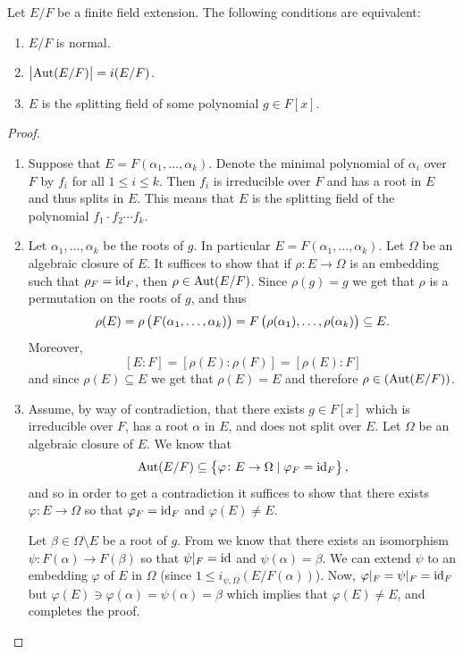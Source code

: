 \documentclass[11pt,a4paper]{article}
\begin{document}
\begin{proposition}
  \label{prop:i-normality}
  Let $E/F$ be a finite field extension.
  The following conditions are equivalent:
  \begin{enumerate}
    \item[(1)] $E/F$ is normal.
    \item[(2)] $\left\lvert\operatorname{Aut}(E/F)\right\rvert = i(E/F)$.
    \item[(3)] $E$ is the splitting field of some polynomial $g \in F[x]$. 
  \end{enumerate}
\end{proposition}
\begin{proof} \phantom{}
  \begin{enumerate}
    \item[$(1 \to 3)$] Suppose that $E = F(\alpha_1,\dots,\alpha_k)$.
      Denote the minimal polynomial of $\alpha_i$ over $F$
      by $f_i$ for all $1 \le i \le k$.
      Then $f_i$ is irreducible over $F$ and has a root in $E$
      and thus splits in $E$.
      This means that $E$ is the splitting field of the polynomial
      $f_1 \cdot f_2 \cdots f_k$.
    \item[$(3 \to 2)$] Let $\alpha_1,\dots,\alpha_k$ be the roots of $g$.
      In particular $E = F(\alpha_1,\dots,\alpha_k)$.
      Let $\Omega$ be an algebraic closure of $E$.
      It suffices to show that if $\rho \colon E \to \Omega$
      is an embedding such that $\rho_F = \operatorname{id}_F$, then $\rho \in \operatorname{Aut}(E/F)$.
      Since $\rho(g) = g$ we get that
      $\rho$ is a permutation on the roots of $g$,
      and thus
      \[
        \rho(E) =
        \rho\del{F(\alpha_1,\dots,\alpha_k)} =
        F\del{\rho(\alpha_1),\dots,\rho(\alpha_k)} \subseteq E.
      \]
      Moreover,
      \[
        [E : F] =
        \left[\rho(E) : \rho(F)\right] =
        \left[\rho(E) : F\right]
      \]
      and since $\rho(E) \subseteq E$ we get that $\rho(E) = E$
      and therefore $\rho \in (\operatorname{Aut}(E/F))$.
    \item[$(2 \to 1)$]
      Assume, by way of contradiction,
      that there exists $g \in F[x]$ which is irreducible over $F$,
      has a root $\alpha$ in $E$, and does not split over $E$.
      Let $\Omega$ be an algebraic closure of $E$.
      We know that
      \[
        \operatorname{Aut}(E/F) \subseteq
        \left\{\varphi \colon E \to \Omega \mid \varphi_F = \operatorname{id}_F\right\},
      \]
      and so in order to get a contradiction it suffices to show
      that there exists $\varphi \colon E \to \Omega$
      so that $\varphi_F = \operatorname{id}_F$ and $\varphi(E) \neq E$.

      Let $\beta \in \Omega \setminus E$ be a root of $g$.
      From 
      we know that there exists an isomorphism
      $\psi \colon F(\alpha) \to F(\beta)$
      so that $\psi\vert_F = \operatorname{id}$ and $\psi(\alpha) = \beta$.
      We can extend $\psi$ to an embedding $\varphi$ of $E$ in $\Omega$
      (since $1 \le i_{\psi,\Omega}(E/F(\alpha))$).
      Now, $\varphi\vert_F = \psi\vert_F = \operatorname{id}_F$
      but $\varphi(E) \ni \varphi(\alpha) = \psi(\alpha) = \beta$
      which implies that $\varphi(E) \neq E$, and completes the proof.
  \end{enumerate}
\end{proof}
\end{document}
